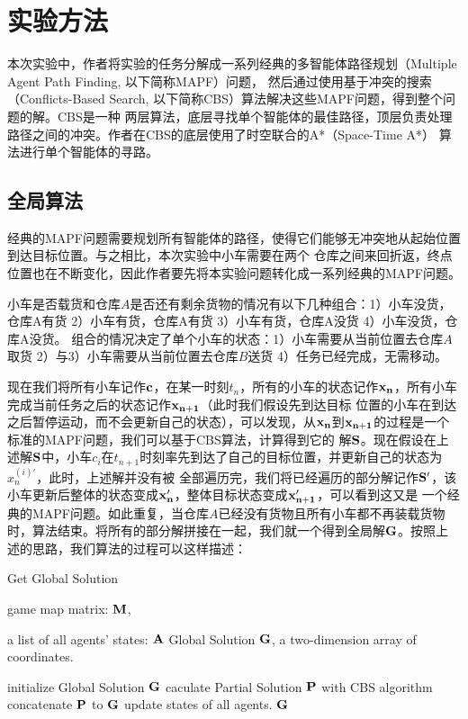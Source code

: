 \documentclass[UTF8]{ctexart}  %
\begin{document}
\section{实验方法}
本次实验中，作者将实验的任务分解成一系列经典的多智能体路径规划（Multiple Agent Path Finding, 以下简称MAPF）问题，
然后通过使用基于冲突的搜索（Conflicts-Based Search, 以下简称CBS）算法解决这些MAPF问题，得到整个问题的解。CBS是一种
两层算法，底层寻找单个智能体的最佳路径，顶层负责处理路径之间的冲突。作者在CBS的底层使用了时空联合的A*（Space-Time A*）
算法进行单个智能体的寻路。
\subsection{全局算法}
经典的MAPF问题需要规划所有智能体的路径，使得它们能够无冲突地从起始位置到达目标位置。与之相比，本次实验中小车需要在两个
仓库之间来回折返，终点位置也在不断变化，因此作者要先将本实验问题转化成一系列经典的MAPF问题。

小车是否载货和仓库$A$是否还有剩余货物的情况有以下几种组合：1）小车没货，仓库A有货 2）小车有货，仓库A有货 3）小车有货，仓库A没货 4）小车没货，仓库A没货。
组合的情况决定了单个小车的状态：1）小车需要从当前位置去仓库$A$取货 2）与3）小车需要从当前位置去仓库$B$送货 4）任务已经完成，无需移动。

现在我们将所有小车记作$\bf c$，在某一时刻$t_n$，所有的小车的状态记作$\bf x_n$，所有小车完成当前任务之后的状态记作$\bf x_{n+1}$（此时我们假设先到达目标
位置的小车在到达之后暂停运动，而不会更新自己的状态），可以发现，从$\bf x_n$到$\bf x_{n+1}$的过程是一个标准的MAPF问题，我们可以基于CBS算法，计算得到它的
解$\bf S$。现在假设在上述解$\bf S$中，小车$c_i$在$t_{n+1}$时刻率先到达了自己的目标位置，并更新自己的状态为$\displaystyle x_n^{(i)\prime}$，此时，上述解并没有被
全部遍历完，我们将已经遍历的部分解记作$\bf S^{\prime}$，该小车更新后整体的状态变成$\bf x_n^{\prime}$，整体目标状态变成$\bf x_{n+1}^{\prime}$，可以看到这又是
一个经典的MAPF问题。如此重复，当仓库$A$已经没有货物且所有小车都不再装载货物时，算法结束。将所有的部分解拼接在一起，我们就一个得到全局解$\bf G$。按照上述的思路，我们算法的过程可以这样描述：

\begin{algorithm}[H]
    \renewcommand{\algorithmicrequire}{\textbf{Input:}}
	\renewcommand{\algorithmicensure}{\textbf{Output:}}
    \caption{Get Global Solution}
    \label{alg:example}
    \begin{algorithmic}[1]
        \REQUIRE 

            game map matrix: $\bf M$,

            a list of all agents' states: $\bf A$
        \ENSURE
            Global Solution $\bf G$, a two-dimension array of coordinates.

        \STATE initialize Global Solution $\bf G$  
            \STATE caculate Partial Solution $\bf P$ with CBS algorithm
            \STATE concatenate $\bf P $ to $\bf G$
            \STATE update states of all agents.
        \ENDWHILE
        \RETURN $\bf G$
    \end{algorithmic}
\end{algorithm}
\end{document}
